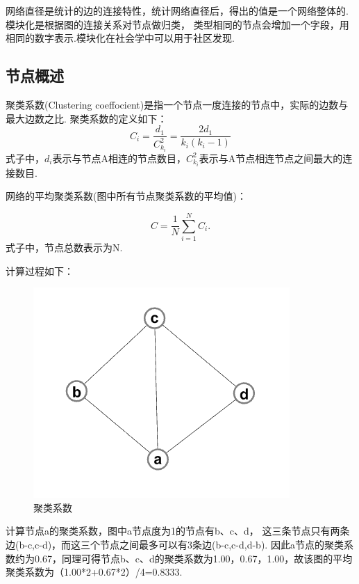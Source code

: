 \documentclass[bachelor,adobefonts]{jnuthesis}
\begin{document}

网络直径是统计的边的连接特性，统计网络直径后，得出的值是一个网络整体的.模块化是根据图的连接关系对节点做归类，
类型相同的节点会增加一个字段，用相同的数字表示.模块化在社会学中可以用于社区发现.
\subsection{节点概述}
聚类系数(Clustering coeffocient)\cite{kaiser2008mean}是指一个节点一度连接的节点中，实际的边数与最大边数之比.
聚类系数的定义如下：
  \begin{equation}
    C_i = \frac{d_1}{C_{k_i}^{2}} = \frac{2d_1}{k_i(k_i-1)}
  \end{equation} 
式子中，$d_i$表示与节点A相连的节点数目，$C_{k_i}^{2}$表示与A节点相连节点之间最大的连接数目.

  网络的平均聚类系数(图中所有节点聚类系数的平均值)：

  \begin{equation}
    C = \frac{1}{N}\sum_{i = 1}^{N}C_i.
  \end{equation}
式子中，节点总数表示为N.

计算过程如下：
\begin{figure}[h!]
  \centering
  \includegraphics[width=0.6\linewidth]{juleixishu.png}
  \caption{聚类系数}
\end{figure}
计算节点a的聚类系数，图中a节点度为1的节点有b、c、d， 这三条节点只有两条边(b-c,c-d)，而这三个节点之间最多可以有3条边(b-c,c-d,d-b).
因此a节点的聚类系数约为0.67，同理可得节点b、c、d的聚类系数为1.00，0.67，1.00，故该图的平均聚类系数为（1.00*2+0.67*2）/4=0.8333.
\end{document}
